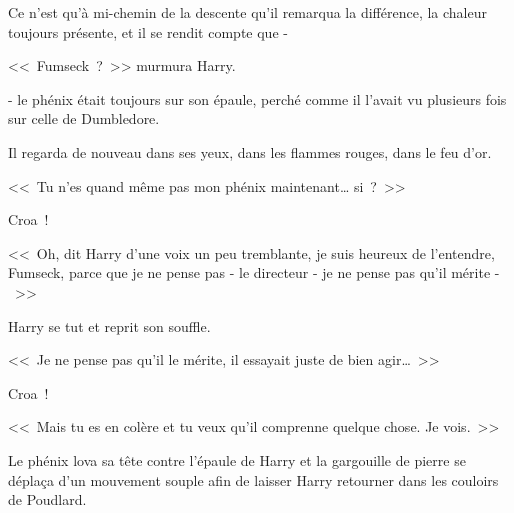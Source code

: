 Ce n'est qu'à mi-chemin de la descente qu'il remarqua la différence, la chaleur toujours présente, et il se rendit compte que -

<<~Fumseck~?~>> murmura Harry.

- le phénix était toujours sur son épaule, perché comme il l'avait vu plusieurs fois sur celle de Dumbledore.

Il regarda de nouveau dans ses yeux, dans les flammes rouges, dans le feu d'or.

<<~Tu n'es quand même pas mon phénix maintenant… si~?~>>

Croa~!

<<~Oh, dit Harry d'une voix un peu tremblante, je suis heureux de l'entendre, Fumseck, parce que je ne pense pas - le directeur - je ne pense pas qu'il mérite -~>>

Harry se tut et reprit son souffle.

<<~Je ne pense pas qu'il le mérite, il essayait juste de bien agir…~>>

Croa~!

<<~Mais tu es en colère et tu veux qu'il comprenne quelque chose. Je vois.~>>

Le phénix lova sa tête contre l'épaule de Harry et la gargouille de pierre se déplaça d'un mouvement souple afin de laisser Harry retourner dans les couloirs de Poudlard. 

